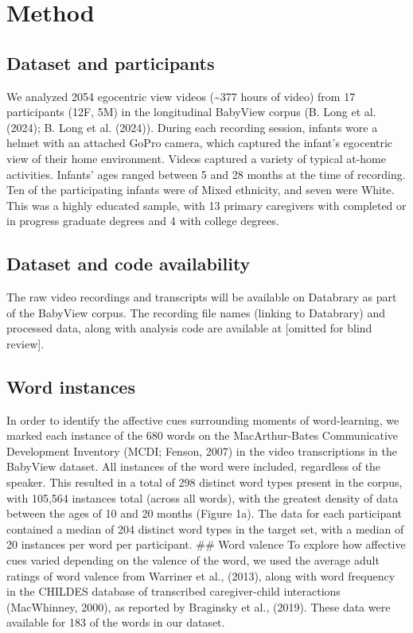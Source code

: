 \documentclass[10pt, letterpaper]{article}
\begin{document}
\section{Method}\label{method}

\subsection{Dataset and participants}\label{dataset-and-participants}

We analyzed 2054 egocentric view videos (\textasciitilde377 hours of
video) from 17 participants (12F, 5M) in the longitudinal BabyView
corpus (B. Long et al. (2024); B. Long et al. (2024)). During each
recording session, infants wore a helmet with an attached GoPro camera,
which captured the infant's egocentric view of their home environment.
Videos captured a variety of typical at-home activities. Infants' ages
ranged between 5 and 28 months at the time of recording. Ten of the
participating infants were of Mixed ethnicity, and seven were White.
This was a highly educated sample, with 13 primary caregivers with
completed or in progress graduate degrees and 4 with college degrees.

\subsection{Dataset and code
availability}\label{dataset-and-code-availability}

The raw video recordings and transcripts will be available on Databrary
as part of the BabyView corpus. The recording file names (linking to
Databrary) and processed data, along with analysis code are available at
{[}omitted for blind review{]}.

\subsection{Word instances}\label{word-instances}

In order to identify the affective cues surrounding moments of
word-learning, we marked each instance of the 680 words on the
MacArthur-Bates Communicative Development Inventory (MCDI; Fenson, 2007)
in the video transcriptions in the BabyView dataset. All instances of
the word were included, regardless of the speaker. This resulted in a
total of 298 distinct word types present in the corpus, with 105,564
instances total (across all words), with the greatest density of data
between the ages of 10 and 20 months (Figure 1a). The data for each
participant contained a median of 204 distinct word types in the target
set, with a median of 20 instances per word per participant. \#\# Word
valence To explore how affective cues varied depending on the valence of
the word, we used the average adult ratings of word valence from
Warriner et al., (2013), along with word frequency in the CHILDES
database of transcribed caregiver-child interactions (MacWhinney, 2000),
as reported by Braginsky et al., (2019). These data were available for
183 of the words in our dataset.
\end{document}
